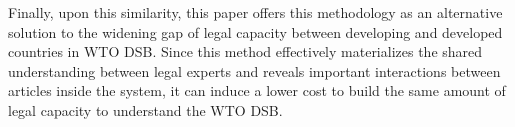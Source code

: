 

Finally, upon this similarity, this paper offers this methodology as
an alternative solution to the widening gap of legal capacity between developing and developed countries in WTO DSB.
Since this method effectively materializes the shared understanding between legal experts and reveals important interactions between articles inside the system,
it can induce a lower cost to build the same amount of legal capacity to understand the WTO DSB.



